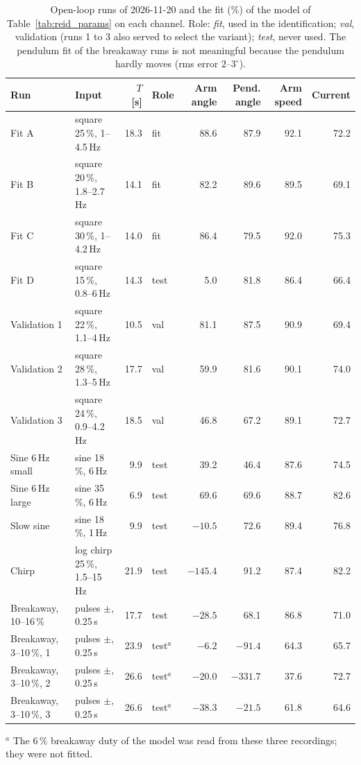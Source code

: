 \documentclass[a4paper,11pt]{article}
\begin{document}
\begin{table}[h]
\centering
\caption{Open-loop runs of 2026-11-20 and the fit (\%) of the model of Table~\ref{tab:reid_params} on each channel. Role: \emph{fit}, used in the identification; \emph{val}, validation (runs 1 to 3 also served to select the variant); \emph{test}, never used. The pendulum fit of the breakaway runs is not meaningful because the pendulum hardly moves (rms error $2$--$3^\circ$).}
\label{tab:openloop}
\footnotesize\setlength{\tabcolsep}{3pt}
\begin{tabular}{@{}llrlrrrr@{}}
\toprule
Run & Input & $T$ [s] & Role & Arm angle & Pend. angle & Arm speed & Current \\
\midrule
Fit A & square 25\,\%, 1--4.5\,Hz & 18.3 & fit & 88.6 & 87.9 & 92.1 & 72.2 \\
Fit B & square 20\,\%, 1.8--2.7\,Hz & 14.1 & fit & 82.2 & 89.6 & 89.5 & 69.1 \\
Fit C & square 30\,\%, 1--4.2\,Hz & 14.0 & fit & 86.4 & 79.5 & 92.0 & 75.3 \\
Fit D & square 15\,\%, 0.8--6\,Hz & 14.3 & test & 5.0 & 81.8 & 86.4 & 66.4 \\
Validation 1 & square 22\,\%, 1.1--4\,Hz & 10.5 & val & 81.1 & 87.5 & 90.9 & 69.4 \\
Validation 2 & square 28\,\%, 1.3--5\,Hz & 17.7 & val & 59.9 & 81.6 & 90.1 & 74.0 \\
Validation 3 & square 24\,\%, 0.9--4.2\,Hz & 18.5 & val & 46.8 & 67.2 & 89.1 & 72.7 \\
Sine 6\,Hz small & sine 18\,\%, 6\,Hz & 9.9 & test & 39.2 & 46.4 & 87.6 & 74.5 \\
Sine 6\,Hz large & sine 35\,\%, 6\,Hz & 6.9 & test & 69.6 & 69.6 & 88.7 & 82.6 \\
Slow sine & sine 18\,\%, 1\,Hz & 9.9 & test & $-10.5$ & 72.6 & 89.4 & 76.8 \\
Chirp & log chirp 25\,\%, 1.5--15\,Hz & 21.9 & test & $-145.4$ & 91.2 & 87.4 & 82.2 \\
Breakaway, 10--16\,\% & pulses $\pm$, 0.25\,s & 17.7 & test & $-28.5$ & 68.1 & 86.8 & 71.0 \\
Breakaway, 3--10\,\%, 1 & pulses $\pm$, 0.25\,s & 23.9 & test$^{a}$ & $-6.2$ & $-91.4$ & 64.3 & 65.7 \\
Breakaway, 3--10\,\%, 2 & pulses $\pm$, 0.25\,s & 26.6 & test$^{a}$ & $-20.0$ & $-331.7$ & 37.6 & 72.7 \\
Breakaway, 3--10\,\%, 3 & pulses $\pm$, 0.25\,s & 26.6 & test$^{a}$ & $-38.3$ & $-21.5$ & 61.8 & 64.6 \\
\bottomrule
\end{tabular}

\smallskip
\raggedright\footnotesize $^{a}$ The 6\,\% breakaway duty of the model was read from these three recordings; they were not fitted.
\end{table}
\end{document}
